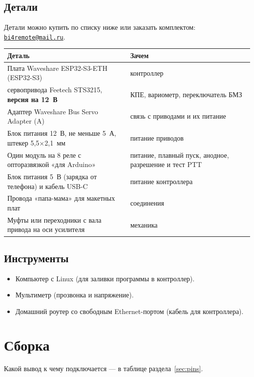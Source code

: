 \documentclass[a4paper,11pt]{article}
\makeatletter
\newcommand{\ordermail}{\href{mailto:bi4remote@mail.ru}{\texttt{bi4remote@mail.ru}}}
\makeatother
\begin{document}
\subsection{Детали}

Детали можно купить по списку ниже или заказать комплектом: \ordermail.

\noindent\begin{tabularx}{\textwidth}{@{}>{\raggedright\arraybackslash}p{}X@{}}
\toprule
\textbf{Деталь} & \textbf{Зачем} \\
\midrule
Плата Waveshare ESP32-S3-ETH (ESP32-S3) & контроллер \\
3 сервопривода Feetech STS3215, \textbf{версия на 12~В} & КПЕ, вариометр, переключатель БМЗ \\
Адаптер Waveshare Bus Servo Adapter (A) & связь с приводами и их питание \\
Блок питания 12~В, не меньше 5~А, штекер 5,5$\times$2,1~мм & питание приводов \\
Один модуль на 8 реле с опторазвязкой «для Arduino» & питание, плавный пуск, анодное, разрешение и тест PTT \\
Блок питания 5~В (зарядка от телефона) и кабель USB-C & питание контроллера \\
Провода «папа-мама» для макетных плат & соединения \\
Муфты или переходники с вала привода на оси усилителя & механика \\
\bottomrule
\end{tabularx}

\subsection{Инструменты}

\begin{itemize}
  \item Компьютер с Linux (для заливки программы в контроллер).
  \item Мультиметр (прозвонка и напряжение).
  \item Домашний роутер со свободным Ethernet-портом (кабель для контроллера).
\end{itemize}

\section{Сборка}

Какой вывод к чему подключается — в таблице раздела~\ref{sec:pins}.
\end{document}
